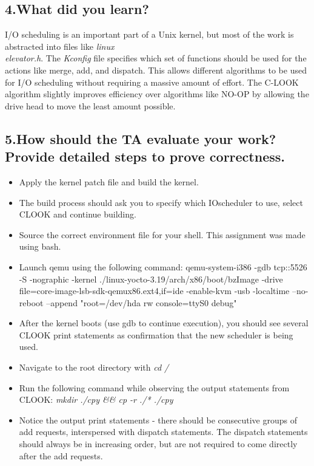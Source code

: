 \documentclass[letterpaper,10pt,fleqn]{article}
\begin{document}
	\subsection*{4.What did you learn?}
	I/O scheduling is an important part of a Unix kernel, but most of the work is abstracted into files like \textit{linux\\elevator.h}.
	The \textit{Kconfig} file specifies which set of functions should be used for the actions like merge, add, and dispatch.
	This allows different algorithms to be used for I/O scheduling without requiring a massive amount of effort.
	The C-LOOK algorithm slightly improves efficiency over algorithms like NO-OP by allowing the drive head to move the least amount possible.

	\subsection*{5.How should the TA evaluate your work? Provide detailed steps to prove correctness.}
	\begin{itemize}
		\item Apply the kernel patch file and build the kernel.
		\item The build process should ask you to specify which IOscheduler to use, select CLOOK and continue building.
		\item Source the correct environment file for your shell. This assignment was made using bash.
		\item Launch qemu using the following command:
		qemu-system-i386 -gdb tcp::5526 -S -nographic -kernel ./linux-yocto-3.19/arch/x86/boot/bzImage -drive file=core-image-lsb-sdk-qemux86.ext4,if=ide -enable-kvm -usb -localtime --no-reboot --append "root=/dev/hda rw console=ttyS0 debug"

		\item After the kernel boots (use gdb to continue execution), you should see several CLOOK print statements as confirmation that the new scheduler is being used.
		\item Navigate to the root directory with \textit{cd /}
		\item Run the following command while observing the output statements from CLOOK: \textit{mkdir ./cpy \&\& cp -r ./* ./cpy}
		\item Notice the output print statements - there should be consecutive groups of add requests, interspersed with dispatch statements.
		The dispatch statements should always be in increasing order, but are not required to come directly after the add requests.
	\end{itemize}
\end{document}
